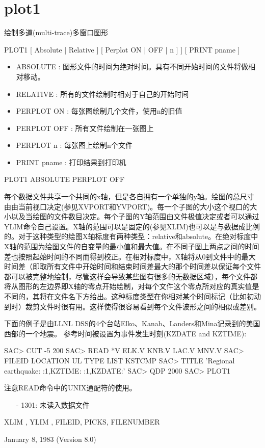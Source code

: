 \section{plot1}
\label{cmd:plot1}

绘制多道(multi-trace)多窗口图形

PLOT1 [ Absolute | Relative ] [ Perplot ON | OFF | n ] ] [ PRINT pname ]

\begin{itemize}
\item ABSOLUTE : 图形文件的时间为绝对时间。具有不同开始时间的文件将做相对移动。
\item RELATIVE : 所有的文件绘制时相对于自己的开始时间
\item PERPLOT ON : 每张图绘制几个文件，使用n的旧值 
\item PERPLOT OFF : 所有文件绘制在一张图上 
\item PERPLOT n : 每张图上绘制n个文件 
\item PRINT pname : 打印结果到打印机 
\end{itemize}

PLOT1 ABSOLUTE PERPLOT OFF

每个数据文件共享一个共同的x轴，但是各自拥有一个单独的y轴。绘图的总尺寸由由当前视口决定(参见XVPORT和YVPORT)。每一个子图的大小这个视口的大小以及当绘图的文件数目决定。每个子图的Y轴范围由文件极值决定或者可以通过YLIM命令自己设置。X轴的范围可以是固定的(参见XLIM)也可以是与数据成比例的。对于这种类型的绘图X轴标度有两种类型：relative和absolute。在绝对标度中X轴的范围为绘图文件的自变量的最小值和最大值。在不同子图上两点之间的时间差也按照起始时间的不同而得到校正。在相对标度中，X轴将从0到文件中的最大时间差（即取所有文件中开始时间和结束时间差最大的那个时间差以保证每个文件都可以被完整地绘制，尽管这样会导致某些图有很多的无数据区域），每个文件都将从图形的左边界即X轴的零点开始绘制，对每个文件这个零点所对应的真实值是不同的，其将在文件名下方给出。这种标度类型在你相对某个时间标记（比如初动到时）裁剪文件时很有用。这样使得很容易看到每个文件波形之间的相似或差别。

下面的例子是由LLNL DSS的4个台站Elko、Kanab、Landers和Mina记录到的美国西部的一个地震。
参考时间被设置为事件发生时刻(KZDATE and KZTIME):
\begin{SACCode}
SAC> CUT -5 200
SAC> READ *V
 ELK.V KNB.V LAC.V MNV.V
SAC> FILEID LOCATION UL TYPE LIST KSTCMP
SAC> TITLE 'Regional earthquake:  :1,KZTIME:  :1,KZDATE:'
SAC> QDP 2000
SAC> PLOT1
\end{SACCode}
注意READ命令中的UNIX通配符的使用。

\begin{itemize}
\item[-]1301: 未读入数据文件
\end{itemize}

XLIM , YLIM , FILEID, PICKS, FILENUMBER

January 8, 1983 (Version 8.0)
